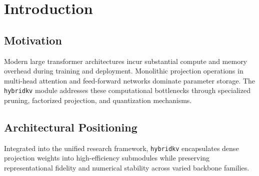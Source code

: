 \section{Introduction}

\subsection{Motivation}
Modern large transformer architectures incur substantial compute and memory overhead during training and deployment. Monolithic projection operations in multi-head attention and feed-forward networks dominate parameter storage. The \texttt{hybridkv} module addresses these computational bottlenecks through specialized pruning, factorized projection, and quantization mechanisms.

\subsection{Architectural Positioning}
Integrated into the unified research framework, \texttt{hybridkv} encapsulates dense projection weights into high-efficiency submodules while preserving representational fidelity and numerical stability across varied backbone families.
